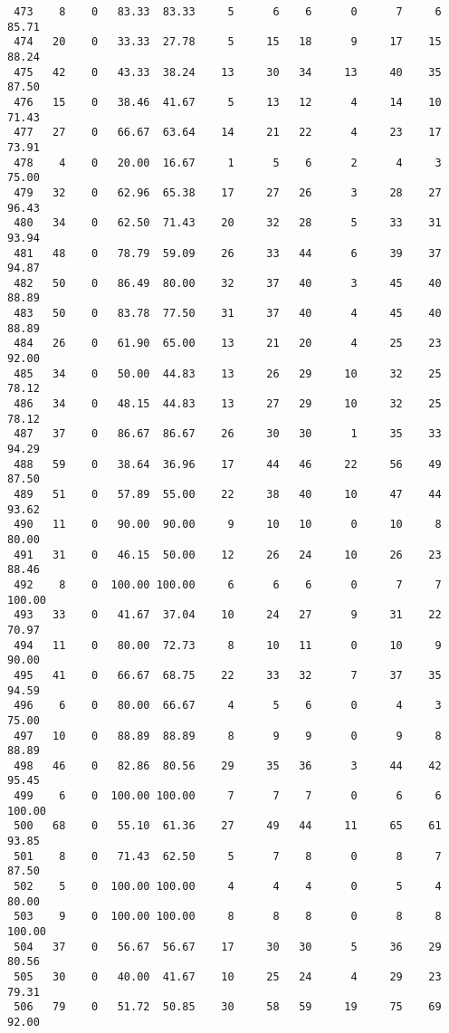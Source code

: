\begin{verbatim}
 473    8    0   83.33  83.33     5      6    6      0      7     6    85.71
 474   20    0   33.33  27.78     5     15   18      9     17    15    88.24
 475   42    0   43.33  38.24    13     30   34     13     40    35    87.50
 476   15    0   38.46  41.67     5     13   12      4     14    10    71.43
 477   27    0   66.67  63.64    14     21   22      4     23    17    73.91
 478    4    0   20.00  16.67     1      5    6      2      4     3    75.00
 479   32    0   62.96  65.38    17     27   26      3     28    27    96.43
 480   34    0   62.50  71.43    20     32   28      5     33    31    93.94
 481   48    0   78.79  59.09    26     33   44      6     39    37    94.87
 482   50    0   86.49  80.00    32     37   40      3     45    40    88.89
 483   50    0   83.78  77.50    31     37   40      4     45    40    88.89
 484   26    0   61.90  65.00    13     21   20      4     25    23    92.00
 485   34    0   50.00  44.83    13     26   29     10     32    25    78.12
 486   34    0   48.15  44.83    13     27   29     10     32    25    78.12
 487   37    0   86.67  86.67    26     30   30      1     35    33    94.29
 488   59    0   38.64  36.96    17     44   46     22     56    49    87.50
 489   51    0   57.89  55.00    22     38   40     10     47    44    93.62
 490   11    0   90.00  90.00     9     10   10      0     10     8    80.00
 491   31    0   46.15  50.00    12     26   24     10     26    23    88.46
 492    8    0  100.00 100.00     6      6    6      0      7     7   100.00
 493   33    0   41.67  37.04    10     24   27      9     31    22    70.97
 494   11    0   80.00  72.73     8     10   11      0     10     9    90.00
 495   41    0   66.67  68.75    22     33   32      7     37    35    94.59
 496    6    0   80.00  66.67     4      5    6      0      4     3    75.00
 497   10    0   88.89  88.89     8      9    9      0      9     8    88.89
 498   46    0   82.86  80.56    29     35   36      3     44    42    95.45
 499    6    0  100.00 100.00     7      7    7      0      6     6   100.00
 500   68    0   55.10  61.36    27     49   44     11     65    61    93.85
 501    8    0   71.43  62.50     5      7    8      0      8     7    87.50
 502    5    0  100.00 100.00     4      4    4      0      5     4    80.00
 503    9    0  100.00 100.00     8      8    8      0      8     8   100.00
 504   37    0   56.67  56.67    17     30   30      5     36    29    80.56
 505   30    0   40.00  41.67    10     25   24      4     29    23    79.31
 506   79    0   51.72  50.85    30     58   59     19     75    69    92.00

\end{verbatim}
